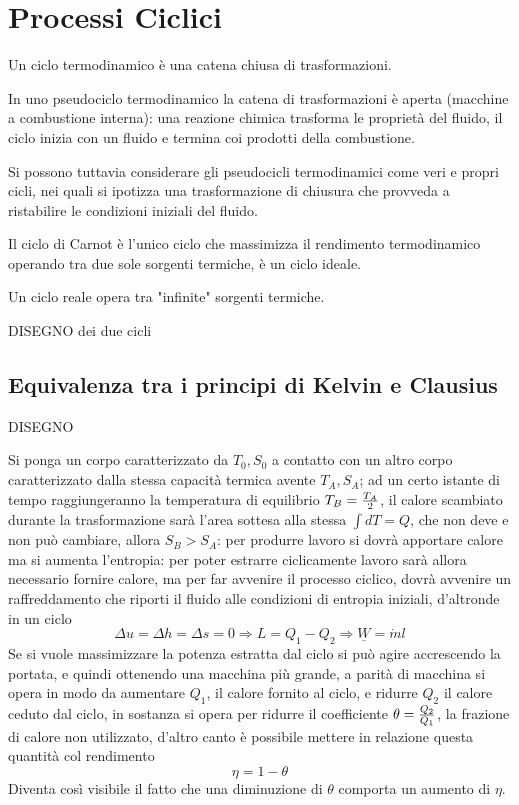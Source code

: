 \section{Processi Ciclici}
\begin{adjustwidth}{2in}{}
	Un ciclo termodinamico è una catena chiusa di trasformazioni. 
	
	In uno pseudociclo termodinamico la catena di trasformazioni è aperta (macchine a combustione interna): una reazione chimica trasforma le proprietà del fluido, il ciclo inizia con un fluido e termina coi prodotti della combustione. \newline 
	
	Si possono tuttavia considerare gli pseudocicli termodinamici come veri e propri cicli, nei quali si ipotizza una trasformazione di chiusura che provveda a ristabilire  le condizioni iniziali del fluido. \newline 
	
	Il ciclo di Carnot è l'unico ciclo che massimizza il rendimento termodinamico operando tra due sole sorgenti termiche, è un ciclo ideale. 
	
	Un ciclo reale opera tra "infinite" sorgenti termiche. 
	
	DISEGNO dei due cicli 	
\end{adjustwidth}




\subsection{Equivalenza tra i principi di Kelvin e Clausius} \label{par:eq}
\begin{adjustwidth}{2in}{}
	DISEGNO
	
	Si ponga un corpo caratterizzato da $T_0, S_0$ a contatto con un altro corpo caratterizzato dalla stessa capacità termica avente $T_A, S_A$; ad un certo istante di tempo raggiungeranno la temperatura di equilibrio $T_B = {T_A\over2}$, il calore scambiato durante la trasformazione sarà l'area sottesa alla stessa $\int dT = Q$, che non deve e non può cambiare, allora $S_B>S_A$: per produrre lavoro si dovrà apportare calore ma si aumenta l'entropia: per poter estrarre ciclicamente lavoro sarà allora necessario fornire calore, ma per far avvenire il processo ciclico, dovrà avvenire un raffreddamento che riporti il fluido alle condizioni di entropia iniziali, d'altronde in un ciclo
	\[\Delta u = \Delta h = \Delta s = 0\Rightarrow L = Q_1-Q_2 \Rightarrow \underline{W} = \dot{m}l\]
	Se si vuole massimizzare la potenza estratta dal ciclo si può agire accrescendo la portata, e quindi ottenendo una macchina più grande, a parità di macchina si opera in modo da aumentare $Q_1$, il calore fornito al ciclo, e ridurre $Q_2$ il calore ceduto dal ciclo, in sostanza si opera per ridurre il coefficiente $\theta={Q_2\over Q_1}$, la frazione di calore non utilizzato, d'altro canto è possibile mettere in relazione questa quantità col rendimento
	\[\eta = 1 - \theta\]
	Diventa così visibile il fatto che una diminuzione di $\theta$ comporta un aumento di $\eta$.  
\end{adjustwidth}





